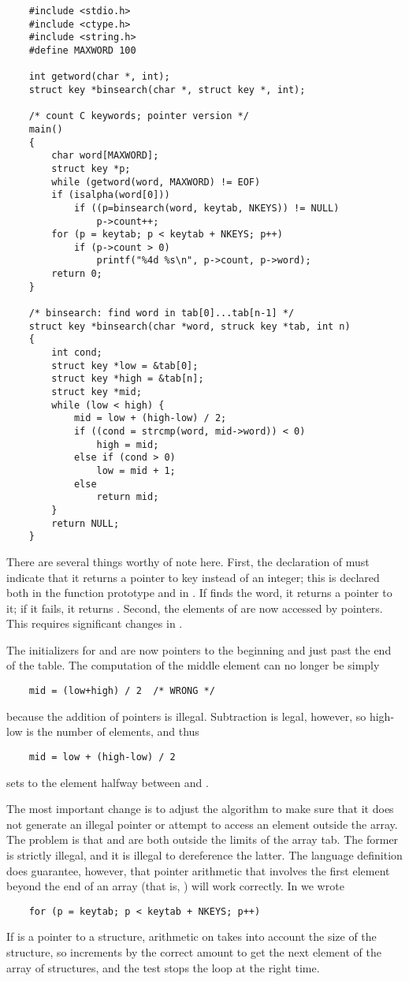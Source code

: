 \begin{lstlisting}
	#include <stdio.h>
	#include <ctype.h>
	#include <string.h>
	#define MAXWORD 100

	int getword(char *, int);
	struct key *binsearch(char *, struct key *, int);

	/* count C keywords; pointer version */
	main()
	{
		char word[MAXWORD];
		struct key *p;
		while (getword(word, MAXWORD) != EOF)
		if (isalpha(word[0]))
			if ((p=binsearch(word, keytab, NKEYS)) != NULL)
				p->count++;
		for (p = keytab; p < keytab + NKEYS; p++)
			if (p->count > 0)
				printf("%4d %s\n", p->count, p->word);
		return 0;
	}

	/* binsearch: find word in tab[0]...tab[n-1] */
	struct key *binsearch(char *word, struck key *tab, int n)
	{
		int cond;
		struct key *low = &tab[0];
		struct key *high = &tab[n];
		struct key *mid;
		while (low < high) {
			mid = low + (high-low) / 2;
			if ((cond = strcmp(word, mid->word)) < 0)
				high = mid;
			else if (cond > 0)
				low = mid + 1;
			else
				return mid;
		}
		return NULL;
	}
\end{lstlisting}
There are several things worthy of note here.
First, the declaration of  must indicate that it returns a pointer to  key instead of an integer; this is declared both in the function prototype and in .
If  finds the word, it returns a pointer to it; if it fails, it returns .
Second, the elements of  are now accessed by pointers. This requires significant changes in .

The initializers for  and  are now pointers to the beginning and just past the end of the table.
The computation of the middle element can no longer be simply
\begin{lstlisting}
	mid = (low+high) / 2  /* WRONG */
\end{lstlisting}
because the addition of pointers is illegal.
Subtraction is legal, however, so high-low is the number of elements, and thus
\begin{lstlisting}
	mid = low + (high-low) / 2
\end{lstlisting}
sets  to the element halfway between  and .

The most important change is to adjust the algorithm to make sure that it does not generate an illegal pointer or attempt to access an element outside the array.
The problem is that  and  are both outside the limits of the array tab.
The former is strictly illegal, and it is illegal to dereference the latter.
The language definition does guarantee, however, that pointer arithmetic that involves the first element beyond the end of an array (that is, ) will work correctly.
In  we wrote
\begin{lstlisting}
	for (p = keytab; p < keytab + NKEYS; p++)
\end{lstlisting}
If  is a pointer to a structure, arithmetic on  takes into account the size of the structure, so  increments  by the correct amount to get the next element of the array of structures, and the test stops the loop at the right time.

